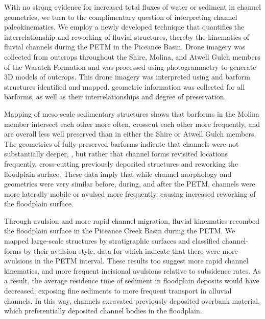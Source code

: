 \documentclass[draft]{compact_proposal}
\begin{document}

With no strong evidence for increased total fluxes of water or sediment in channel geometries, we turn to the complimentary question of interpreting channel paleokinematics.
We employ a newly developed technique that quantifies the interrelationship and reworking of fluvial structures, thereby  the kinematics of fluvial channels during the PETM in the Piceance Basin.
Drone imagery was collected from  outcrops throughout the Shire, Molina, and Atwell Gulch members of the Wasatch Formation and was processed using photogrammetry to generate 3D models of outcrops.
This drone imagery was interpreted using  and barform structures identified and mapped. geometric information was collected for all barforms, as well as their interrelationships and degree of preservation.

Mapping of meso-scale sedimentary structures shows that barforms in the Molina member intersect each other more often, crosscut each other more frequently, and are overall less well preserved than in either the Shire or Atwell Gulch members.
The geometries of fully-preserved barforms indicate that channels were not substantially deeper, , but rather that channel forms revisited locations frequently, cross-cutting previously deposited structures and reworking the floodplain surface.
These data imply that while channel morphology and geometries were very similar before, during, and after the PETM, channels were more laterally mobile or avulsed more frequently, causing increased reworking of the floodplain surface.

Through avulsion and more rapid channel migration, fluvial kinematics recombed the floodplain surface in the Piceance Creek Basin during the PETM.
We mapped large-scale structures by stratigraphic surfaces and classified channel-forms by their avulsion style, data for which indicate that there were more  avulsions in the PETM interval.
These results too suggest more rapid channel kinematics, and more frequent incisional avulsions relative to subsidence rates.
As a result, the average residence time of sediment in floodplain deposits would have decreased, exposing fine sediments to more frequent transport in alluvial channels.
In this way, channels excavated previously deposited overbank material, which preferentially deposited channel bodies in the floodplain.
\end{document}
